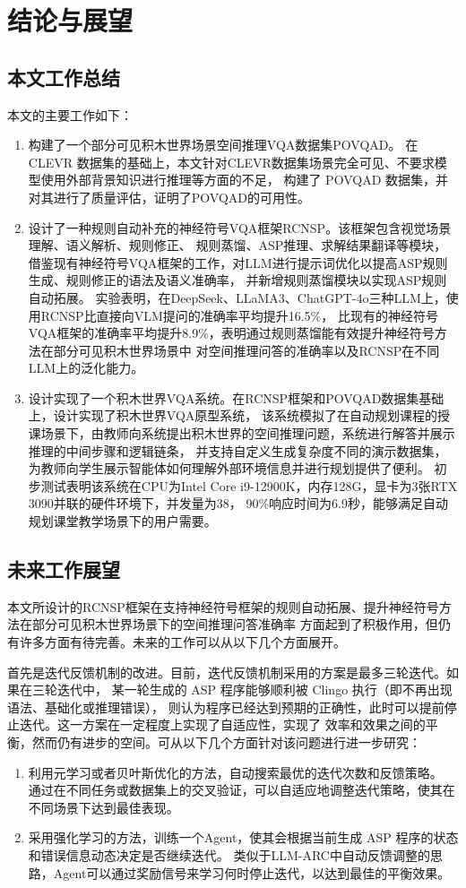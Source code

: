 \chapter{结论与展望}
\section{本文工作总结}
本文的主要工作如下：
\begin{enumerate}[nosep]
\item 构建了一个部分可见积木世界场景空间推理VQA数据集POVQAD。
在 CLEVR 数据集的基础上，本文针对CLEVR数据集场景完全可见、不要求模型使用外部背景知识进行推理等方面的不足，
构建了 POVQAD 数据集，并对其进行了质量评估，证明了POVQAD的可用性。
\item 设计了一种规则自动补充的神经符号VQA框架RCNSP。该框架包含视觉场景理解、语义解析、规则修正、
规则蒸馏、ASP推理、求解结果翻译等模块，借鉴现有神经符号VQA框架的工作，对LLM进行提示词优化以提高ASP规则生成、规则修正的语法及语义准确率，
并新增规则蒸馏模块以实现ASP规则自动拓展。
实验表明，在DeepSeek、LLaMA3、ChatGPT-4o三种LLM上，使用RCNSP比直接向VLM提问的准确率平均提升16.5\%，
比现有的神经符号VQA框架的准确率平均提升8.9\%，表明通过规则蒸馏能有效提升神经符号方法在部分可见积木世界场景中
对空间推理问答的准确率以及RCNSP在不同LLM上的泛化能力。
\item 设计实现了一个积木世界VQA系统。在RCNSP框架和POVQAD数据集基础上，设计实现了积木世界VQA原型系统，
该系统模拟了在自动规划课程的授课场景下，由教师向系统提出积木世界的空间推理问题，系统进行解答并展示推理的中间步骤和逻辑链条，
并支持自定义生成复杂度不同的演示数据集，
为教师向学生展示智能体如何理解外部环境信息并进行规划提供了便利。
初步测试表明该系统在CPU为Intel Core i9-12900K，内存128G，显卡为3张RTX 3090并联的硬件环境下，并发量为38，
90\%响应时间为6.9秒，能够满足自动规划课堂教学场景下的用户需要。
\end{enumerate}
\section{未来工作展望}
本文所设计的RCNSP框架在支持神经符号框架的规则自动拓展、提升神经符号方法在部分可见积木世界场景下的空间推理问答准确率
方面起到了积极作用，但仍有许多方面有待完善。未来的工作可以从以下几个方面展开。

首先是迭代反馈机制的改进。目前，迭代反馈机制采用的方案是最多三轮迭代。如果在三轮迭代中，
某一轮生成的 ASP 程序能够顺利被 Clingo 执行（即不再出现语法、基础化或推理错误），
则认为程序已经达到预期的正确性，此时可以提前停止迭代。这一方案在一定程度上实现了自适应性，实现了
效率和效果之间的平衡，然而仍有进步的空间。可从以下几个方面针对该问题进行进一步研究：
\begin{enumerate}[nosep]
    \item 利用元学习或者贝叶斯优化的方法，自动搜索最优的迭代次数和反馈策略。
通过在不同任务或数据集上的交叉验证，可以自适应地调整迭代策略，使其在不同场景下达到最佳表现。
    \item 采用强化学习的方法，训练一个Agent，使其会根据当前生成 ASP 程序的状态和错误信息动态决定是否继续迭代。
类似于LLM-ARC中自动反馈调整的思路，Agent可以通过奖励信号来学习何时停止迭代，以达到最佳的平衡效果\cite{kalyanpur2024llmarcenhancingllmsautomated}。
\end{enumerate}


